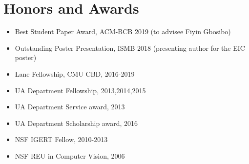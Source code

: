 \documentclass[10pt,letterpaper]{article}
\begin{document}
\section*{Honors and Awards}
\begin{itemize}
    \item Best Student Paper Award, ACM-BCB 2019 (to advisee Fiyin Gbosibo)
    \item Outstanding Poster Presentation, ISMB 2018 (presenting author for the EIC poster)
    \item Lane Fellowship, CMU CBD, 2016-2019
    \item UA Department Fellowship, 2013,2014,2015
    \item UA Department Service award, 2013
    \item UA Department Scholarship award, 2016
    \item NSF IGERT Fellow, 2010-2013
    \item NSF REU in Computer Vision, 2006
\end{itemize}
\end{document}
